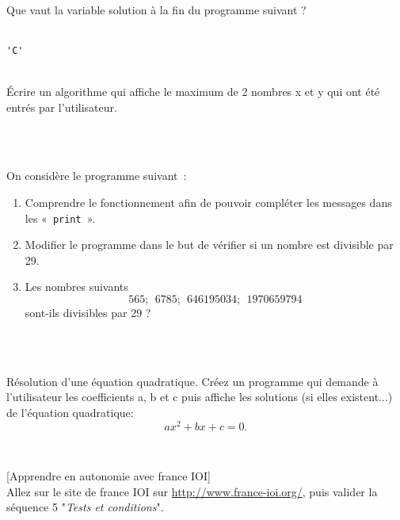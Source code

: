\documentclass[a4paper,12pt]{article}
\begin{document}
\newpage

\exo{}  ~\\ 
Que vaut la variable solution à la fin du programme suivant ? 

\begin{correction}
	~\\ 
	\lstinline{'C'}
\end{correction}
\finexo


\exo{}  ~\\ 
Écrire un algorithme qui affiche le maximum de 2 nombres x et y qui ont été entrés par l’utilisateur.

\begin{correction}
	~\\ 
	
\end{correction}
\finexo


\exo{}  ~\\ 
On considère le programme suivant :

\begin{enumerate}
	\item Comprendre le fonctionnement afin de pouvoir compléter les messages dans les « \lstinline{print} ».
	\item Modifier le programme dans le but de vérifier si un nombre est divisible par 29.
	\item Les nombres suivants 
	$$565 ;\ \  6785 ;\ \  646 195 034 ;\ \  1 970 659 794$$
	sont-ils divisibles par 29 ?
\end{enumerate}
\begin{correction}
	~\\ 
	
\end{correction}
\finexo

\exo{}  ~\\ 
Résolution d’une équation quadratique. Créez un programme qui demande à l’utilisateur les coefficients a, b et c  puis affiche les solutions (si elles existent...) de l’équation quadratique: 
$$a  x^2 + b  x + c = 0.$$ 

\begin{correction}
	~\\ 
	
\end{correction}
\finexo

\exo{}[Apprendre en  autonomie avec france IOI]  ~\\ 
Allez sur le site de france IOI sur \url{http://www.france-ioi.org/}, puis valider la séquence 5 "\textit{Tests et conditions}".
\finexo
\end{document}
